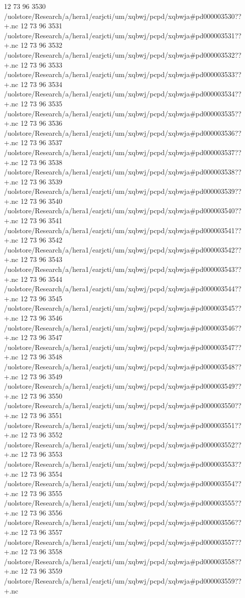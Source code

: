 12 73 96
3530
/uolstore/Research/a/hera1/earjcti/um/xqbwj/pcpd/xqbwja#pd000003530??+.nc
12 73 96
3531
/uolstore/Research/a/hera1/earjcti/um/xqbwj/pcpd/xqbwja#pd000003531??+.nc
12 73 96
3532
/uolstore/Research/a/hera1/earjcti/um/xqbwj/pcpd/xqbwja#pd000003532??+.nc
12 73 96
3533
/uolstore/Research/a/hera1/earjcti/um/xqbwj/pcpd/xqbwja#pd000003533??+.nc
12 73 96
3534
/uolstore/Research/a/hera1/earjcti/um/xqbwj/pcpd/xqbwja#pd000003534??+.nc
12 73 96
3535
/uolstore/Research/a/hera1/earjcti/um/xqbwj/pcpd/xqbwja#pd000003535??+.nc
12 73 96
3536
/uolstore/Research/a/hera1/earjcti/um/xqbwj/pcpd/xqbwja#pd000003536??+.nc
12 73 96
3537
/uolstore/Research/a/hera1/earjcti/um/xqbwj/pcpd/xqbwja#pd000003537??+.nc
12 73 96
3538
/uolstore/Research/a/hera1/earjcti/um/xqbwj/pcpd/xqbwja#pd000003538??+.nc
12 73 96
3539
/uolstore/Research/a/hera1/earjcti/um/xqbwj/pcpd/xqbwja#pd000003539??+.nc
12 73 96
3540
/uolstore/Research/a/hera1/earjcti/um/xqbwj/pcpd/xqbwja#pd000003540??+.nc
12 73 96
3541
/uolstore/Research/a/hera1/earjcti/um/xqbwj/pcpd/xqbwja#pd000003541??+.nc
12 73 96
3542
/uolstore/Research/a/hera1/earjcti/um/xqbwj/pcpd/xqbwja#pd000003542??+.nc
12 73 96
3543
/uolstore/Research/a/hera1/earjcti/um/xqbwj/pcpd/xqbwja#pd000003543??+.nc
12 73 96
3544
/uolstore/Research/a/hera1/earjcti/um/xqbwj/pcpd/xqbwja#pd000003544??+.nc
12 73 96
3545
/uolstore/Research/a/hera1/earjcti/um/xqbwj/pcpd/xqbwja#pd000003545??+.nc
12 73 96
3546
/uolstore/Research/a/hera1/earjcti/um/xqbwj/pcpd/xqbwja#pd000003546??+.nc
12 73 96
3547
/uolstore/Research/a/hera1/earjcti/um/xqbwj/pcpd/xqbwja#pd000003547??+.nc
12 73 96
3548
/uolstore/Research/a/hera1/earjcti/um/xqbwj/pcpd/xqbwja#pd000003548??+.nc
12 73 96
3549
/uolstore/Research/a/hera1/earjcti/um/xqbwj/pcpd/xqbwja#pd000003549??+.nc
12 73 96
3550
/uolstore/Research/a/hera1/earjcti/um/xqbwj/pcpd/xqbwja#pd000003550??+.nc
12 73 96
3551
/uolstore/Research/a/hera1/earjcti/um/xqbwj/pcpd/xqbwja#pd000003551??+.nc
12 73 96
3552
/uolstore/Research/a/hera1/earjcti/um/xqbwj/pcpd/xqbwja#pd000003552??+.nc
12 73 96
3553
/uolstore/Research/a/hera1/earjcti/um/xqbwj/pcpd/xqbwja#pd000003553??+.nc
12 73 96
3554
/uolstore/Research/a/hera1/earjcti/um/xqbwj/pcpd/xqbwja#pd000003554??+.nc
12 73 96
3555
/uolstore/Research/a/hera1/earjcti/um/xqbwj/pcpd/xqbwja#pd000003555??+.nc
12 73 96
3556
/uolstore/Research/a/hera1/earjcti/um/xqbwj/pcpd/xqbwja#pd000003556??+.nc
12 73 96
3557
/uolstore/Research/a/hera1/earjcti/um/xqbwj/pcpd/xqbwja#pd000003557??+.nc
12 73 96
3558
/uolstore/Research/a/hera1/earjcti/um/xqbwj/pcpd/xqbwja#pd000003558??+.nc
12 73 96
3559
/uolstore/Research/a/hera1/earjcti/um/xqbwj/pcpd/xqbwja#pd000003559??+.nc
